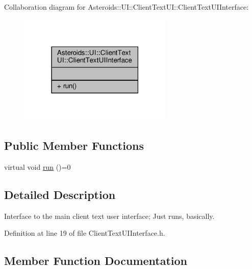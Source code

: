 Collaboration diagram for Asteroids\+:\+:UI\+:\+:Client\+Text\+UI\+:\+:Client\+Text\+U\+I\+Interface\+:\nopagebreak
\begin{figure}[H]
\begin{center}
\leavevmode
\includegraphics[width=207pt]{classAsteroids_1_1UI_1_1ClientTextUI_1_1ClientTextUIInterface__coll__graph}
\end{center}
\end{figure}
\subsection*{Public Member Functions}
\begin{DoxyCompactItemize}
\item 
virtual void \hyperlink{classAsteroids_1_1UI_1_1ClientTextUI_1_1ClientTextUIInterface_a9eba8946cd9262221e8b55cea4acd92d}{run} ()=0
\end{DoxyCompactItemize}


\subsection{Detailed Description}
Interface to the main client text user interface; Just runs, basically. 

Definition at line 19 of file Client\+Text\+U\+I\+Interface.\+h.



\subsection{Member Function Documentation}
\mbox{\label{classAsteroids_1_1UI_1_1ClientTextUI_1_1ClientTextUIInterface_a9eba8946cd9262221e8b55cea4acd92d}} 
